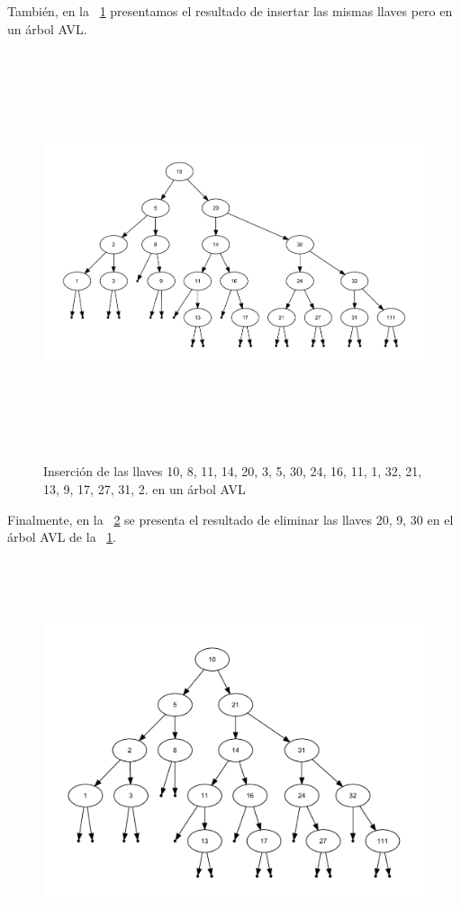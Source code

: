 \documentclass[paper=a4, fontsize=11pt]{scrartcl} %
\numberwithin{equation}{section} %
\numberwithin{figure}{section} %
\numberwithin{table}{section} %
\begin{document}
También, en la \figurename~\ref{fig:avltree03} presentamos el resultado de insertar las mismas llaves pero en un árbol AVL.
\begin{figure}[!h]
	\centering
	\includegraphics[width=\textwidth,height=12cm]{avltree03}
	\caption{Inserción de las llaves 10, 8, 11, 14, 20, 3, 5, 30, 24, 16, 11, 1, 32, 21, 13, 9, 17, 27, 31, 2. en un árbol AVL}
	\label{fig:avltree03}
\end{figure}
\newpage
Finalmente, en la \figurename~\ref{fig:avltree05} se presenta el resultado de eliminar las llaves 20, 9, 30 en el árbol AVL de la \figurename~\ref{fig:avltree03}.
\begin{figure}[!h]
	\centering
	\includegraphics[width=\textwidth,height=12cm]{avltree05}
	\label{fig:avltree05}
\end{figure}
\end{document}
